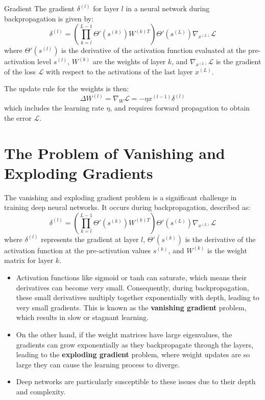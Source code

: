 \begin{definitionbox}{Gradient}
The gradient \( \delta^{(l)} \) for layer \( l \) in a neural network during backpropagation is given by:
\[ \delta^{(l)} = \left( \prod_{k=l}^{L-1} \Theta'(s^{(k)})W^{(k)T} \right)\Theta'(s^{(L)}) \nabla_{x^{(L)}} \mathcal{L} \]
where \( \Theta'(s^{(l)}) \) is the derivative of the activation function evaluated at the pre-activation level \( s^{(l)} \), \( W^{(k)} \) are the weights of layer \( k \), and \( \nabla_{x^{(L)}} \mathcal{L} \) is the gradient of the loss \( \mathcal{L} \) with respect to the activations of the last layer \( x^{(L)} \).

The update rule for the weights is then:
\[ \Delta W^{(l)} = \nabla_W \mathcal{L} = -\eta x^{(l-1)} \delta^{(l)} \]
which includes the learning rate \( \eta \), and requires forward propagation to obtain the error \( \mathcal{L} \).
\end{definitionbox}

\section{The Problem of Vanishing and Exploding Gradients}

The vanishing and exploding gradient problem is a significant challenge in training deep neural networks. It occurs during backpropagation, described as:
\[ \delta^{(l)} = \left( \prod_{k=l}^{L-1} \Theta'(s^{(k)})W^{(k)T} \right)\Theta'(s^{(L)}) \nabla_{x^{(L)}} \mathcal{L} \]
where \( \delta^{(l)} \) represents the gradient at layer \( l \), \( \Theta'(s^{(k)}) \) is the derivative of the activation function at the pre-activation values \( s^{(k)} \), and \( W^{(k)} \) is the weight matrix for layer \( k \).

\begin{itemize}
    \item Activation functions like sigmoid or tanh can saturate, which means their derivatives can become very small. Consequently, during backpropagation, these small derivatives multiply together exponentially with depth, leading to very small gradients. This is known as the \textbf{vanishing gradient} problem, which results in slow or stagnant learning.
    \item On the other hand, if the weight matrices have large eigenvalues, the gradients can grow exponentially as they backpropagate through the layers, leading to the \textbf{exploding gradient} problem, where weight updates are so large they can cause the learning process to diverge.
    \item Deep networks are particularly susceptible to these issues due to their depth and complexity.
\end{itemize}

